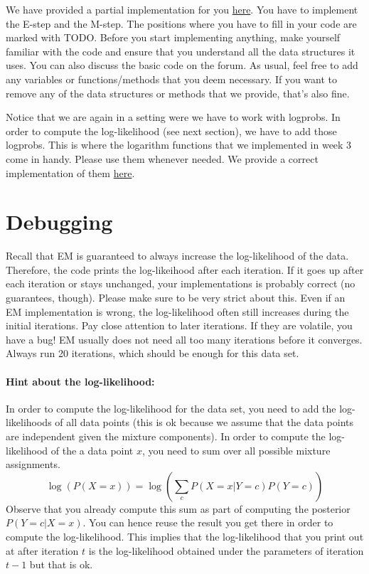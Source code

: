 \documentclass[11pt, leqno, a4paper]{article}
\begin{document}
We have provided a partial implementation for you \href{https://github.com/BasicProbability/BasicProbability.github.io/raw/master/Homework/Programming/2016-17/Assignment5/expectation_maximisation.py}{here}. 
You have to implement the E-step and the M-step. The positions where you have to fill in your code are marked with TODO. Before you start implementing anything,
make yourself familiar with the code and ensure that you understand all the data structures it uses. You can also discuss the basic code on the forum. As usual, feel
free to add any variables or functions/methods that you deem necessary. If you want to remove any of the data structures or methods that we provide, that's also fine.

Notice that we are again in a setting were we have to work with logprobs. In order to compute the log-likelihood (see next section), we have to add those logprobs.
This is where the logarithm functions that we implemented in week 3 come in handy. Please use them whenever needed. We provide a correct implementation of
them \href{https://github.com/BasicProbability/BasicProbability.github.io/raw/master/Homework/Programming/2016-17/Assignment5/logarithms.py}{here}.

\section{Debugging}

Recall that EM is guaranteed to always increase the log-likelihood of the data. Therefore, the code prints the log-likeihood after each iteration.
If it goes up after each iteration or stays unchanged, your implementations is probably correct (no guarantees, though). Please make sure to be very strict about
this. Even if an EM implementation is wrong, the log-likelihood often still increases during the initial iterations. Pay close attention to later iterations. If they
are volatile, you have a bug! EM usually does not need all too many iterations before it converges. Always run 20 iterations, which should be enough for 
this data set.

\paragraph{Hint about the log-likelihood:} In order to compute the log-likelihood for the data set, you need to add the log-likelihoods of all data points (this is
ok because we assume that the data points are independent given the mixture components). In order to compute the log-likelihood of the a data point $ x $, you need
to sum over all possible mixture assignments.
\begin{equation}
\log(P(X=x)) = \log\left(\sum_{c} P(X=x|Y=c) P(Y=c)\right)
\end{equation}
Observe that you already compute this sum as part of computing the posterior $ P(Y=c|X=x) $. You can hence reuse the result you get there in order to compute the 
log-likelihood. This implies that the log-likelihood that you print out at after iteration $ t $ is the log-likelihood obtained under the parameters of iteration
$ t-1 $ but that is ok.
\end{document}

